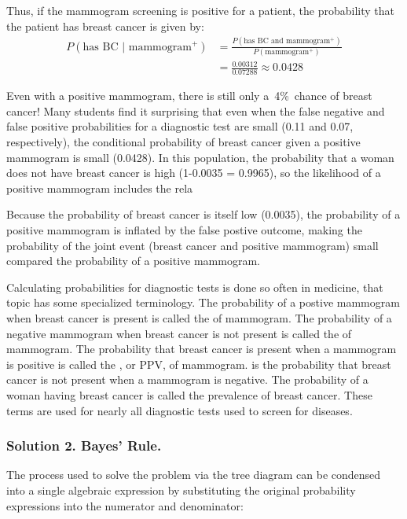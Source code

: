 Thus, if the mammogram screening is positive for a patient, the probability that the patient has breast cancer is given by: 
\begin{align*}
P(\text{has BC } | \text{ mammogram$^+$})
	&= \frac{P(\text{has BC and mammogram$^+$})}{P(\text{mammogram$^+$})}\\
	&= \frac{0.00312}{0.07288} \approx 0.0428
\end{align*}

Even with a positive mammogram, there is still only a~4\%~chance of breast cancer!  Many students find it surprising that even when the false negative and false positive probabilities for a diagnostic test are small (0.11 and 0.07, respectively),  the conditional probability of breast cancer given a positive mammogram is small (0.0428).  In this population, the probability that a woman does not have breast cancer is high (1-0.0035 = 0.9965), so the likelihood of a positive mammogram includes the rela

Because the probability of breast cancer is itself low (0.0035), the probability of a positive mammogram is inflated by the false postive outcome, making the probability of the joint event (breast cancer and positive mammogram) small compared the probability of a positive mammogram.

Calculating probabilities for diagnostic tests is done so often in medicine, that topic has some specialized terminology.  The probability of a postive mammogram when breast cancer is present is called the  of mammogram.  The probability of a negative mammogram when breast cancer is not present is called the  of mammogram.  The probability that breast cancer is present when a mammogram is positive is called the , or PPV, of mammogram.  is the probability that breast cancer is not present when a mammogram is negative.  The probability of a woman having breast cancer is called the prevalence of breast cancer.  These terms are used for nearly all diagnostic tests used to screen for diseases.


\subsubsection{Solution 2. Bayes' Rule.}

The process used to solve the problem via the tree diagram can be condensed into a single algebraic expression by substituting the original probability expressions into the numerator and denominator:

